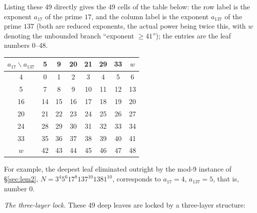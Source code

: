 \documentclass[11pt]{article}
\theoremstyle{remark}
\begin{document}
Listing these 49 directly gives the 49 cells of the table below: the row label is the exponent $a_{17}$ of the prime $17$, and the column label is the exponent $a_{137}$ of the prime $137$ (both are reduced exponents, the actual power being twice this, with $w$ denoting the unbounded branch ``exponent $\ge 41$''); the entries are the leaf numbers $0$--$48$.

\begin{center}\footnotesize
\begin{tabular}{c|ccccccc} $a_{17}\backslash a_{137}$ & 5 & 9 & 20 & 21 & 29 & 33 & $w$ \\ \hline 4  & 0  & 1  & 2  & 3  & 4  & 5  & 6  \\
5  & 7  & 8  & 9  & 10 & 11 & 12 & 13 \\
16 & 14 & 15 & 16 & 17 & 18 & 19 & 20 \\
20 & 21 & 22 & 23 & 24 & 25 & 26 & 27 \\
24 & 28 & 29 & 30 & 31 & 32 & 33 & 34 \\
33 & 35 & 36 & 37 & 38 & 39 & 40 & 41 \\
$w$ & 42 & 43 & 44 & 45 & 46 & 47 & 48 \\
\end{tabular}
\end{center}

For example, the deepest leaf eliminated outright by the mod-9 instance of \S\ref{sec:lem2}, $N = 3^4 5^6 17^8 137^{10} 1381^{10}$, corresponds to $a_{17} = 4$, $a_{137} = 5$, that is, number 0.

\emph{The three-layer lock.} These 49 deep leaves are locked by a three-layer structure:
\end{document}
